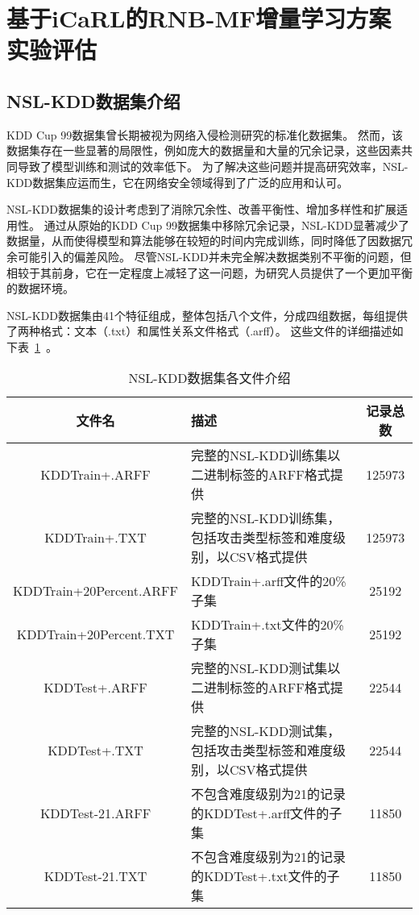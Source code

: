\section{基于iCaRL的RNB-MF增量学习方案实验评估}
\subsection{NSL-KDD数据集\cite{revathi2013detailed}介绍}
KDD Cup 99数据集\cite{tavallaee2009detailed}曾长期被视为网络入侵检测研究的标准化数据集。
然而，该数据集存在一些显著的局限性，例如庞大的数据量和大量的冗余记录，这些因素共同导致了模型训练和测试的效率低下。
为了解决这些问题并提高研究效率，NSL-KDD数据集应运而生，它在网络安全领域得到了广泛的应用和认可。


NSL-KDD数据集的设计考虑到了消除冗余性、改善平衡性、增加多样性和扩展适用性。
通过从原始的KDD Cup 99数据集中移除冗余记录，NSL-KDD显著减少了数据量，从而使得模型和算法能够在较短的时间内完成训练，同时降低了因数据冗余可能引入的偏差风险。
尽管NSL-KDD并未完全解决数据类别不平衡的问题，但相较于其前身，它在一定程度上减轻了这一问题，为研究人员提供了一个更加平衡的数据环境。


NSL-KDD数据集由41个特征组成，整体包括八个文件，分成四组数据，每组提供了两种格式：文本（.txt）和属性关系文件格式（.arff）。
这些文件的详细描述如下表~\ref{tab:NSLKDDFile}~。
\begin{table}[htbp]
  \caption{NSL-KDD数据集各文件介绍}
  \label{tab:NSLKDDFile}
  \begin{tabularx}{\textwidth}{cXc}
    \toprule
    \textbf{文件名} & \textbf{描述} & \textbf{记录总数}\\
  \midrule
    KDDTrain+.ARFF & 完整的NSL-KDD训练集以二进制标签的ARFF格式提供 &125973\\
    KDDTrain+.TXT & 完整的NSL-KDD训练集，包括攻击类型标签和难度级别，以CSV格式提供&125973\\
    KDDTrain+20Percent.ARFF & KDDTrain+.arff文件的20\%子集&25192\\
    KDDTrain+20Percent.TXT & KDDTrain+.txt文件的20\%子集 &25192\\
    KDDTest+.ARFF & 完整的NSL-KDD测试集以二进制标签的ARFF格式提供 &22544\\
    KDDTest+.TXT & 完整的NSL-KDD测试集，包括攻击类型标签和难度级别，以CSV格式提供 & 22544\\
    KDDTest-21.ARFF & 不包含难度级别为21的记录的KDDTest+.arff文件的子集 &11850\\
    KDDTest-21.TXT & 不包含难度级别为21的记录的KDDTest+.txt文件的子集&11850 \\
  \bottomrule
  \end{tabularx}
\end{table}

